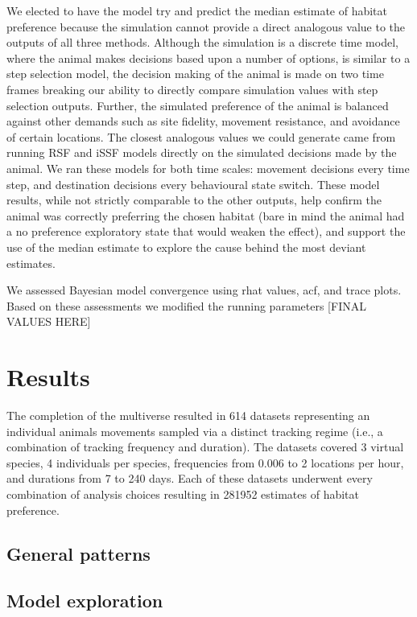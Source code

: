 \documentclass[10pt,a4paper]{article}
\begin{document}
We elected to have the model try and predict the median estimate of habitat preference because the simulation cannot provide a direct analogous value to the outputs of all three methods.
Although the simulation is a discrete time model, where the animal makes decisions based upon a number of options, is similar to a step selection model, the decision making of the animal is made on two time frames breaking our ability to directly compare simulation values with step selection outputs.
Further, the simulated preference of the animal is balanced against other demands such as site fidelity, movement resistance, and avoidance of certain locations.
The closest analogous values we could generate came from running RSF and iSSF models directly on the simulated decisions made by the animal.
We ran these models for both time scales: movement decisions every time step, and destination decisions every behavioural state switch.
These model results, while not strictly comparable to the other outputs, help confirm the animal was correctly preferring the chosen habitat (bare in mind the animal had a no preference exploratory state that would weaken the effect), and support the use of the median estimate to explore the cause behind the most deviant estimates.

We assessed Bayesian model convergence using rhat values, acf, and trace plots.
Based on these assessments we modified the running parameters {[}FINAL VALUES HERE{]}

\hypertarget{results}{%
\section{Results}\label{results}}

The completion of the multiverse resulted in 614 datasets representing an individual animals movements sampled via a distinct tracking regime (i.e., a combination of tracking frequency and duration).
The datasets covered 3 virtual species, 4 individuals per species, frequencies from 0.006 to 2 locations per hour, and durations from 7 to 240 days.
Each of these datasets underwent every combination of analysis choices resulting in
281952 estimates of habitat preference.

\hypertarget{general-patterns}{%
\subsection{General patterns}\label{general-patterns}}

\hypertarget{model-exploration}{%
\subsection{Model exploration}\label{model-exploration}}
\end{document}
